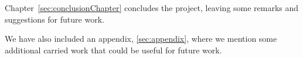 Chapter~\ref{sec:conclusionChapter} concludes the project, leaving some remarks and suggestions for future work.

We have also included an appendix, \ref{sec:appendix}, where we mention some additional carried work that could be useful for future work.


